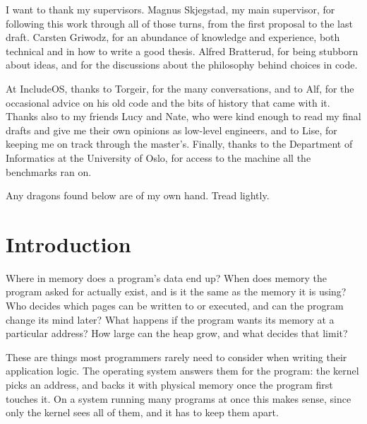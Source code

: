 \documentclass[12pt]{report}
\renewcommand{\_}{\origunderscore\allowbreak}
\begin{document}
I want to thank my supervisors. Magnus Skjegstad, my main supervisor, for following this work through all of those turns, from the first proposal to the last draft. Carsten Griwodz, for an abundance of knowledge and experience, both technical and in how to write a good thesis. Alfred Bratterud, for being stubborn about ideas, and for the discussions about the philosophy behind choices in code.

At IncludeOS, thanks to Torgeir, for the many conversations, and to Alf, for the occasional advice on his old code and the bits of history that came with it. Thanks also to my friends Lucy and Nate, who were kind enough to read my final drafts and give me their own opinions as low-level engineers, and to Lise, for keeping me on track through the master's. Finally, thanks to the Department of Informatics at the University of Oslo, for access to the machine all the benchmarks ran on.

Any dragons found below are of my own hand. Tread lightly.
\tableofcontents

\chapter{Introduction}


Where in memory does a program's data end up? When does memory the program asked for actually exist, and is it the same as the memory it is using? Who decides which pages can be written to or executed, and can the program change its mind later? What happens if the program wants its memory at a particular address? How large can the heap grow, and what decides that limit?

These are things most programmers rarely need to consider when writing their application logic. The operating system answers them for the program: the kernel picks an address, and backs it with physical memory once the program first touches it. On a system running many programs at once this makes sense, since only the kernel sees all of them, and it has to keep them apart.
\end{document}

